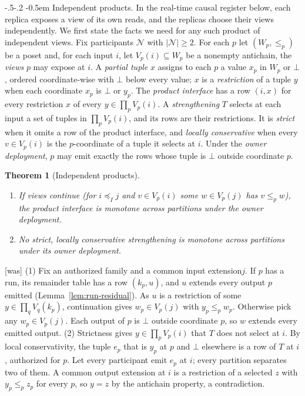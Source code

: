 \documentclass[sigconf]{cidr-2027}
\makeatletter
\newtheorem{theorem}{Theorem}
\theoremstyle{remark}
\renewcommand\paragraph{\@startsection{paragraph}{4}{\z@}%
  {-.5\baselineskip \@plus -2\p@ \@minus -.2\p@}%
  {-0.5em}%
  {\normalfont\bfseries}}
\newcommand{\InputOrd}{\preceq_I}
\newcommand{\indesc}{input extension\xspace} %
\newcommand{\outrel}{extends\xspace}          %
\newcommand{\outnoun}{output extension\xspace}%
\makeatother
\begin{document}
\paragraph{Independent products.}
\color{blue!70!black}In the real-time causal register below, each replica exposes a view of its
own reads, and the replicas choose their views independently.  We first state
the facts we need for any such product of independent views.  Fix participants
$\mathcal N$ with $|\mathcal N|\ge2$.  For each $p$ let $(W_p,\le_p)$ be a poset
and, for each input $i$, let $V_p(i)\subseteq W_p$ be a nonempty antichain, the
\emph{views} $p$ may expose at $i$.  A \emph{partial tuple} $x$ assigns to each
$p$ a value $x_p$ in $W_p$ or $\bot$, ordered coordinate-wise with $\bot$ below
every value; $x$ is a \emph{restriction} of a tuple $y$ when each coordinate
$x_p$ is $\bot$ or $y_p$.  The \emph{product interface} has a row
$(i,x)$ for every restriction $x$ of every $y\in\prod_pV_p(i)$.  A
\emph{strengthening} $T$ selects at each input a set of tuples in
$\prod_pV_p(i)$, and its rows are their restrictions.  It is \emph{strict} when
it omits a row of the product interface, and \emph{locally conservative} when
every $v\in V_p(i)$ is the $p$-coordinate of a tuple it selects at $i$.  Under
the \emph{owner deployment}, $p$ may emit exactly the rows whose tuple is
$\bot$ outside coordinate $p$.\color{black}

\begin{theorem}[Independent products]
\label{thm:product-frontier}
\leavevmode
\begin{enumerate}
  \item If views continue (for $i\InputOrd j$ and $v\in V_p(i)$ some $w\in
        V_p(j)$ has $v\le_p w$), the product interface is monotone across
        partitions under the owner deployment.
  \item No strict, locally conservative strengthening is monotone across
        partitions under its owner deployment.
\end{enumerate}
\end{theorem}



{\footnotesize\color{black!50}\noindent\textsf{[was]} (1) Fix an authorized family and a common \indesc $j$.  If $p$ has a run, its
remainder table has a row $(k_p,u)$, and $u$ \outrel every output $p$ emitted
(Lemma~\ref{lem:run-residual}).  As $u$ is a restriction of some
$y\in\prod_qV_q(k_p)$, continuation gives $w_p\in V_p(j)$ with $y_p\le_p w_p$.
Otherwise pick any $w_p\in V_p(j)$.  Each output of $p$ is $\bot$ outside
coordinate $p$, so $w$ \outrel every emitted output.
(2) Strictness gives $y\in\prod_pV_p(i)$ that $T$ does not select at $i$.  By
local conservativity, the tuple $e_p$ that is $y_p$ at $p$ and $\bot$
elsewhere is a row of $T$ at $i$, authorized for $p$.  Let every participant
emit $e_p$ at $i$; every partition separates two of them.  A common \outnoun
at $i$ is a restriction of a selected $z$ with $y_p\le_p z_p$ for every $p$, so
$y=z$ by the antichain property, a contradiction.\par}
\end{document}
